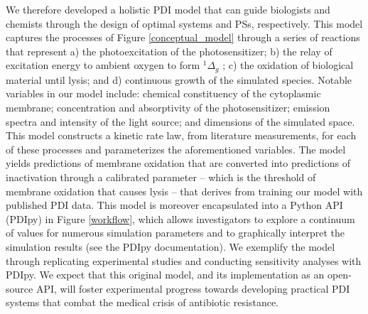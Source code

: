 We therefore developed a holistic PDI model that can guide biologists and chemists through the design of optimal systems and PSs, respectively. This model captures the processes of Figure \ref{conceptual_model} through a series of reactions that represent a) the photoexcitation of the photosensitizer; b) the relay of excitation energy to ambient oxygen to form $^1\Delta_g$ ; c) the oxidation of biological material until lysis; and d) continuous growth of the simulated species. Notable variables in our model include: chemical constituency of the cytoplasmic membrane; concentration and absorptivity of the photosensitizer; emission spectra and intensity of the light source; and dimensions of the simulated space. This model constructs a kinetic rate law, from literature measurements, for each of these processes and parameterizes the aforementioned variables. The model yields predictions of membrane oxidation that are converted into predictions of inactivation through a calibrated parameter -- which is the threshold of membrane oxidation that causes lysis -- that derives from training our model with published PDI data. This model is moreover encapsulated into a Python API (PDIpy) in Figure \ref{workflow}, which allows investigators to explore a continuum of values for numerous simulation parameters and to graphically interpret the simulation results (see the PDIpy documentation). We exemplify the model through replicating experimental studies and conducting sensitivity analyses with PDIpy. We expect that this original model, and its implementation as an open-source API, will foster experimental progress towards developing practical PDI systems that combat the medical crisis of antibiotic resistance. 

